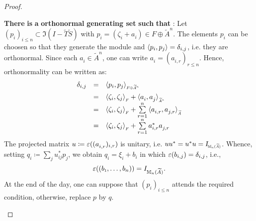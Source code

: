 \begin{proposicao}
\begin{proof}
\begin{itroman}
    \item \textbf{There} \textbf{is} \textbf{a} \textbf{orthonormal} \textbf{generating set}  \textbf{such} \textbf{that} : Let $\left(p_i\right)_{i\leq n} \subset \Im (I-\widetilde{T}\widetilde{S})$ with $p_i = (\zeta_i + a^{\,}_i) \in F\oplus \widetilde{A}^n$. The elements $p_i$ can be choosen so that they generate the module and $\langle {p_i},{p_j}\rangle =  \delta_{i,j}$, i.e. they are orthonormal. Since each $a^{\,}_i \in \widetilde{A}^n$, one can write $a^{\,}_i = (a^{\,}_{i,r})_{r \leq n}$. Hence, orthonormality can be written as:
    \begin{equation*}
        \begin{array}{rcl}
            \delta_{i,j} &=& \sub{\inner{p_i}{p_j}}{F\oplus \widetilde{A}^n} \\
            &=& \vphantom{\sum\limits^n} \sub{\inner{\zeta_i}{\zeta_j}}F + \sub{\inner{a^{\,}_i}{a^{\,}_j}}{\widetilde{A}^n} \\
            &=& \sub{\inner{\zeta_i}{\zeta_j}}F + \sum\limits_{r=1}^n\sub{\inner{a^{\,}_{i,r}}{a^{\,}_{j,r}}}{\widetilde{A}} \\
            &=& \sub{\inner{\zeta_i}{\zeta_j}}F + \sum\limits_{r=1}^n a^*_{i,r}a_{j,r}^{\,}
        \end{array}
    \end{equation*}
    The projected matrix $u \coloneqq \operatorname{{\varepsilon}}((a^{\,}_{i,r})_{i,r})$ is unitary, i.e. $uu^* = u^*u = \sub\Id{\mathbb M_n(\widetilde{A})}$. Whence, setting $q_{i} \coloneqq \sum_{j} u_{ij}^* p_j$, we obtain $q_i = \xi_i+ b_i$ in which $\operatorname{{\varepsilon}}(b_{i,j}) = \delta_{i,j}$, i.e.,
        $$\ep((\sub b1, \ldots, b_n)) = I_{\mathbb M_n(\widetilde{A})}.$$ 
        At the end of the day, one can suppose that $(p_i)_{i\leq n}$ attends the required condition, otherwise, replace $p$ by $q$.


\end{itroman}
\end{proof}
\end{proposicao}
